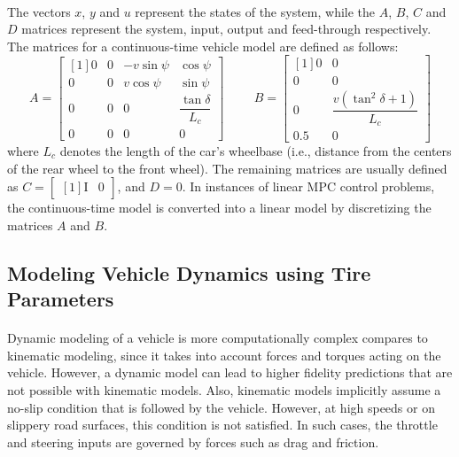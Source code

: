 \paragraph{}
The vectors $x$, $y$ and $u$ represent the states of the system, while the $A$, $B$, $C$ and $D$ matrices represent the system, input, output and feed-through respectively. The matrices for a continuous-time vehicle model are defined as follows:
$$A = \begin{bmatrix}[1]
    0 & 0 & -v\sin\psi & \cos\psi\\
    0 & 0 & v\cos\psi & \sin\psi\\
    0 & 0 & 0 & \dfrac{\tan\delta}{L_c}\\
    0 & 0 & 0 & 0
\end{bmatrix}\hspace{1cm}
B = \begin{bmatrix}[1]
    0 & 0\\
    0 & 0\\
    0 & \dfrac{v(\tan^2\delta + 1)}{L_c}\\
    0.5 & 0
\end{bmatrix}$$
where $L_c$ denotes the length of the car's wheelbase (i.e., distance from the centers of the rear wheel to the front wheel). The remaining matrices are usually defined as $C = \begin{bmatrix}[1]
    \text{I} & 0
\end{bmatrix}$, and $D = 0$. In instances of linear MPC control problems, the continuous-time model is converted into a linear model by discretizing the matrices $A$ and $B$.

\subsection{Modeling Vehicle Dynamics using Tire Parameters}
\paragraph{}
Dynamic modeling of a vehicle is more computationally complex compares to kinematic modeling, since it takes into account forces and torques acting on the vehicle. However, a dynamic model can lead to higher fidelity predictions that are not possible with kinematic models. Also, kinematic models implicitly assume a no-slip condition that is followed by the vehicle. However, at high speeds or on slippery road surfaces, this condition is not satisfied. In such cases, the throttle and steering inputs are governed by forces such as drag and friction. 

